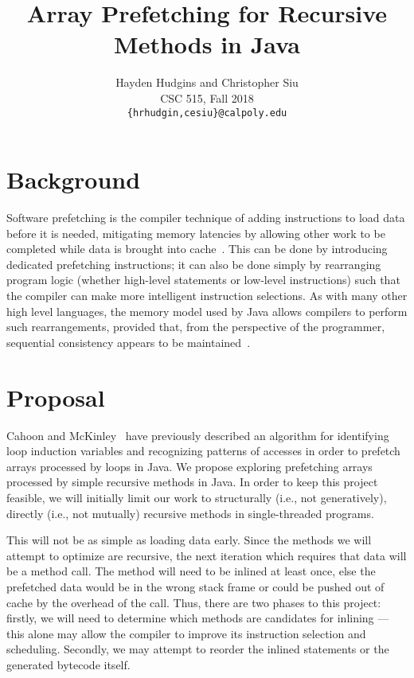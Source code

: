 \documentclass[journal,onecolumn]{IEEEtran}
\begin{document}
\title{Array Prefetching for Recursive Methods in Java}
\author{Hayden Hudgins and Christopher Siu \\
        CSC 515, Fall 2018\\
        \texttt{\{hrhudgin,cesiu\}@calpoly.edu}}

\maketitle
\vspace{-3.5em}


\section{Background}

Software prefetching is the compiler technique of adding instructions to load data before it is needed, mitigating memory latencies by allowing other work to be completed while data is brought into cache~\cite{porterfield}. This can be done by introducing dedicated prefetching instructions; it can also be done simply by rearranging program logic (whether high-level statements or low-level instructions) such that the compiler can make more intelligent instruction selections. As with many other high level languages, the memory model used by Java allows compilers to perform such rearrangements, provided that, from the perspective of the programmer, sequential consistency appears to be maintained~\cite{adve}.


\section{Proposal}

Cahoon and McKinley~\cite{mckinley2} have previously described an algorithm for identifying loop induction variables and recognizing patterns of accesses in order to prefetch arrays processed by loops in Java. We propose exploring prefetching arrays processed by simple recursive methods in Java. In order to keep this project feasible, we will initially limit our work to structurally (i.e., not generatively), directly (i.e., not mutually) recursive methods in single-threaded programs.

This will not be as simple as loading data early. Since the methods we will attempt to optimize are recursive, the next iteration which requires that data will be a method call. The method will need to be inlined at least once, else the prefetched data would be in the wrong stack frame or could be pushed out of cache by the overhead of the call. Thus, there are two phases to this project: firstly, we will need to determine which methods are candidates for inlining --- this alone may allow the compiler to improve its instruction selection and scheduling. Secondly, we may attempt to reorder the inlined statements or the generated bytecode itself.
\end{document}
